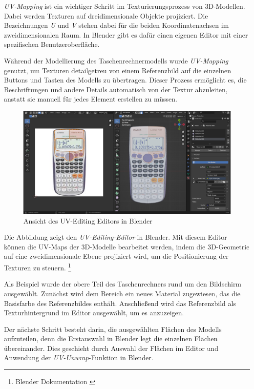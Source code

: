 \textit{UV-Mapping} ist ein wichtiger Schritt im Texturierungsprozess von 3D-Modellen. Dabei werden Texturen auf dreidimensionale Objekte projiziert. Die Bezeichnungen \textit{U} und \textit{V} stehen dabei für die beiden Koordinatenachsen im zweidimensionalen Raum. In Blender gibt es dafür einen eigenen Editor mit einer spezifischen Benutzeroberfläche.

Während der Modellierung des Taschenrechnermodells wurde \textit{UV-Mapping} genutzt, um Texturen detailgetreu von einem Referenzbild auf die einzelnen Buttons und Tasten des Modells zu übertragen. Dieser Prozess ermöglicht es, die Beschriftungen und andere Details automatisch von der Textur abzuleiten, anstatt sie manuell für jedes Element erstellen zu müssen.

\begin{figure}[H]
    \centering
    \includegraphics[width=1\textwidth]{images/uvmappingeditor.png}
    \caption{Ansicht des UV-Editing Editors in Blender}
    \label{fig:hierarchie}
\end{figure}

Die Abbildung zeigt den \textit{UV-Editing-Editor} in Blender. Mit diesem Editor können die UV-Maps der 3D-Modelle bearbeitet werden, indem die 3D-Geometrie auf eine zweidimensionale Ebene projiziert wird, um die Positionierung der Texturen zu steuern. \footnote{Blender Dokumentation \cite{UV-Editing Editor}}

Als Beispiel wurde der obere Teil des Taschenrechners rund um den Bildschirm ausgewählt. Zunächst wird dem Bereich ein neues Material zugewiesen, das die Basisfarbe des Referenzbildes enthält. Anschließend wird das Referenzbild als Texturhintergrund im Editor ausgewählt, um es anzuzeigen.

Der nächste Schritt besteht darin, die ausgewählten Flächen des Modells aufzuteilen, denn die Erstauswahl in Blender legt die einzelnen Flächen übereinander. Dies geschieht durch Auswahl der Flächen im Editor und Anwendung der \textit{UV-Unwrap}-Funktion in Blender.

